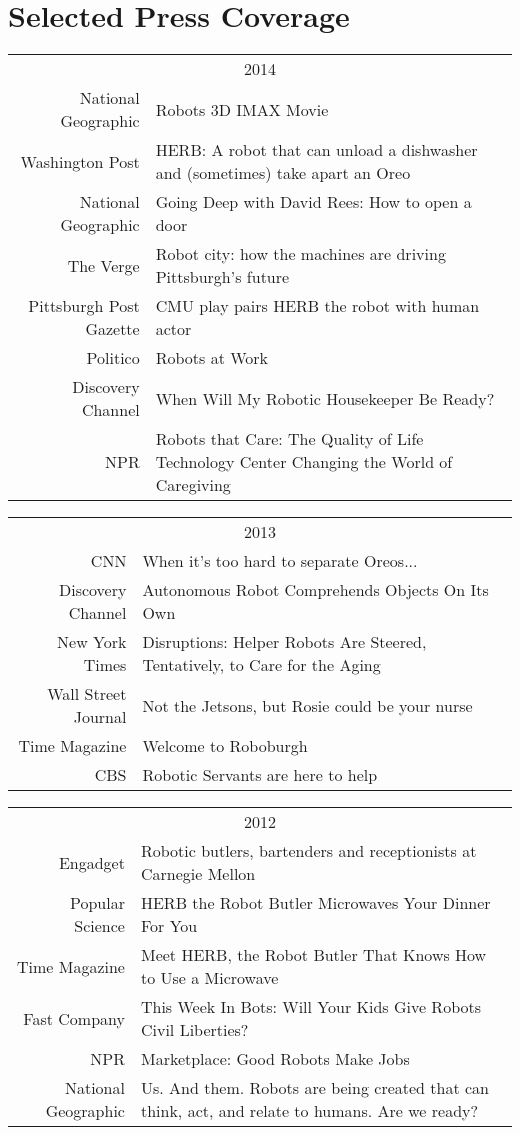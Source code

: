 \documentclass[10pt]{article}
\begin{document}
\section{Selected Press Coverage}
\begin{tabularx}{\linewidth}{rX}
\multicolumn{2}{c}{2014}\\ 
National Geographic & Robots 3D IMAX Movie\\
Washington Post & HERB: A robot that can unload a dishwasher and (sometimes) take apart an Oreo\\
National Geographic & Going Deep with David Rees: How to open a door\\
The Verge & Robot city: how the machines are driving Pittsburgh's future\\
Pittsburgh Post Gazette & CMU play pairs HERB the robot with human actor\\
Politico & Robots at Work\\
Discovery Channel & When Will My Robotic Housekeeper Be Ready?\\
NPR & Robots that Care: The Quality of Life Technology Center Changing the World of Caregiving\\
\end{tabularx}
\begin{tabularx}{\linewidth}{rX}
\multicolumn{2}{c}{2013}\\ 
CNN & When it's too hard to separate Oreos...\\
Discovery Channel & 	Autonomous Robot Comprehends Objects On Its Own\\
New York Times & Disruptions: Helper Robots Are Steered, Tentatively, to Care for the Aging\\
Wall Street Journal & Not the Jetsons, but Rosie could be your nurse\\
Time Magazine & Welcome to Roboburgh\\
CBS & Robotic Servants are here to help\\
\end{tabularx}
\begin{tabularx}{\linewidth}{rX}
\multicolumn{2}{c}{2012}\\ 
Engadget & {Robotic butlers, bartenders and receptionists at Carnegie Mellon}\\
Popular Science & {HERB the Robot Butler Microwaves Your Dinner For You}\\
Time Magazine & {Meet HERB, the Robot Butler That Knows How to Use a Microwave}\\
Fast Company & {This Week In Bots: Will Your Kids Give Robots Civil Liberties?}\\
NPR & {Marketplace: Good Robots Make Jobs}\\
National Geographic & {Us. And them.
Robots are being created that can think, act, and relate to humans. Are we ready?}\\
\end{tabularx}
\end{document}
